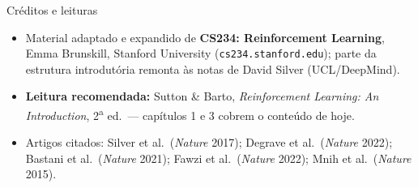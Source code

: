 \documentclass[aspectratio=169, 11pt]{beamer}
\begin{document}
\begin{frame}{Créditos e leituras}
  \begin{itemize}
    \item Material adaptado e expandido de \textbf{CS234: Reinforcement
          Learning}, Emma Brunskill, Stanford University
          (\texttt{cs234.stanford.edu}); parte da estrutura introdutória
          remonta às notas de David Silver (UCL/DeepMind).
    \item \textbf{Leitura recomendada:} Sutton \& Barto,
          \emph{Reinforcement Learning: An Introduction}, 2\textsuperscript{a}
          ed.\ — capítulos 1 e 3 cobrem o conteúdo de hoje.
    \item Artigos citados: Silver et al.\ (\emph{Nature} 2017);
          Degrave et al.\ (\emph{Nature} 2022); Bastani et al.\
          (\emph{Nature} 2021); Fawzi et al.\ (\emph{Nature} 2022);
          Mnih et al.\ (\emph{Nature} 2015).
  \end{itemize}
\end{frame}
\end{document}

